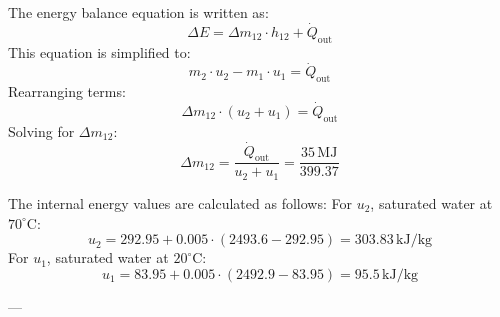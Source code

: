The energy balance equation is written as:  
\[
\Delta E = \Delta m_{12} \cdot h_{12} + \dot{Q}_{\text{out}}
\]  
This equation is simplified to:  
\[
m_{2} \cdot u_{2} - m_{1} \cdot u_{1} = \dot{Q}_{\text{out}}
\]  
Rearranging terms:  
\[
\Delta m_{12} \cdot (u_{2} + u_{1}) = \dot{Q}_{\text{out}}
\]  
Solving for \( \Delta m_{12} \):  
\[
\Delta m_{12} = \frac{\dot{Q}_{\text{out}}}{u_{2} + u_{1}} = \frac{35 \, \text{MJ}}{399.37}
\]  

The internal energy values are calculated as follows:  
For \( u_{2} \), saturated water at \( 70^\circ\text{C} \):  
\[
u_{2} = 292.95 + 0.005 \cdot (2493.6 - 292.95) = 303.83 \, \text{kJ/kg}
\]  
For \( u_{1} \), saturated water at \( 20^\circ\text{C} \):  
\[
u_{1} = 83.95 + 0.005 \cdot (2492.9 - 83.95) = 95.5 \, \text{kJ/kg}
\]  

---